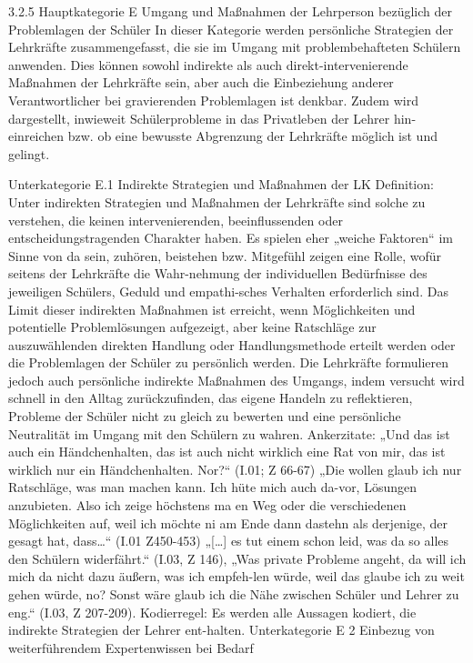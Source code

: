 3.2.5 Hauptkategorie E Umgang und Maßnahmen der Lehrperson bezüglich der Problemlagen der Schüler 
In dieser Kategorie werden persönliche Strategien der Lehrkräfte zusammengefasst, die sie im Umgang mit problembehafteten Schülern anwenden. Dies können sowohl indirekte als auch direkt-intervenierende Maßnahmen der Lehrkräfte sein, aber auch die Einbeziehung anderer Verantwortlicher bei gravierenden Problemlagen ist denkbar. Zudem wird dargestellt, inwieweit Schülerprobleme in das Privatleben der Lehrer hin-einreichen bzw. ob eine bewusste Abgrenzung der Lehrkräfte möglich ist und gelingt. 

Unterkategorie E.1 Indirekte Strategien und Maßnahmen der LK
Definition: Unter indirekten Strategien und Maßnahmen der Lehrkräfte sind solche zu verstehen, die keinen intervenierenden, beeinflussenden oder entscheidungstragenden Charakter haben. Es spielen eher „weiche Faktoren“ im Sinne von da sein, zuhören, beistehen bzw. Mitgefühl zeigen eine Rolle, wofür seitens der Lehrkräfte die Wahr-nehmung der individuellen Bedürfnisse des jeweiligen Schülers, Geduld und empathi-sches Verhalten erforderlich sind. Das Limit dieser indirekten Maßnahmen ist erreicht, wenn Möglichkeiten und potentielle Problemlösungen aufgezeigt, aber keine Ratschläge zur auszuwählenden direkten Handlung oder Handlungsmethode erteilt werden oder die Problemlagen der Schüler zu persönlich werden. Die Lehrkräfte formulieren jedoch auch persönliche indirekte Maßnahmen des Umgangs, indem versucht wird schnell in den Alltag zurückzufinden, das eigene Handeln zu reflektieren, Probleme der Schüler nicht zu gleich zu bewerten und eine persönliche Neutralität im Umgang mit den Schülern zu wahren.
Ankerzitate: „Und das ist auch ein Händchenhalten, das ist auch nicht wirklich eine Rat von mir, das ist wirklich nur ein Händchenhalten. Nor?“ (I.01; Z 66-67)
„Die wollen glaub ich nur Ratschläge, was man machen kann. Ich hüte mich auch da-vor, Lösungen anzubieten. Also ich zeige höchstens ma en Weg oder die verschiedenen Möglichkeiten auf, weil ich möchte ni am Ende dann dastehn als derjenige, der gesagt hat, dass…“ (I.01 Z450-453)
 „[…] es tut einem schon leid, was da so alles den Schülern widerfährt.“ (I.03, Z 146), „Was private Probleme angeht, da will ich mich da nicht dazu äußern, was ich empfeh-len würde, weil das glaube ich zu weit gehen würde, no? Sonst wäre glaub ich die Nähe zwischen Schüler und Lehrer zu eng.“ (I.03, Z 207-209). 
Kodierregel: Es werden alle Aussagen kodiert, die indirekte Strategien der Lehrer ent-halten. 
Unterkategorie E 2 Einbezug von weiterführendem Expertenwissen bei Bedarf
